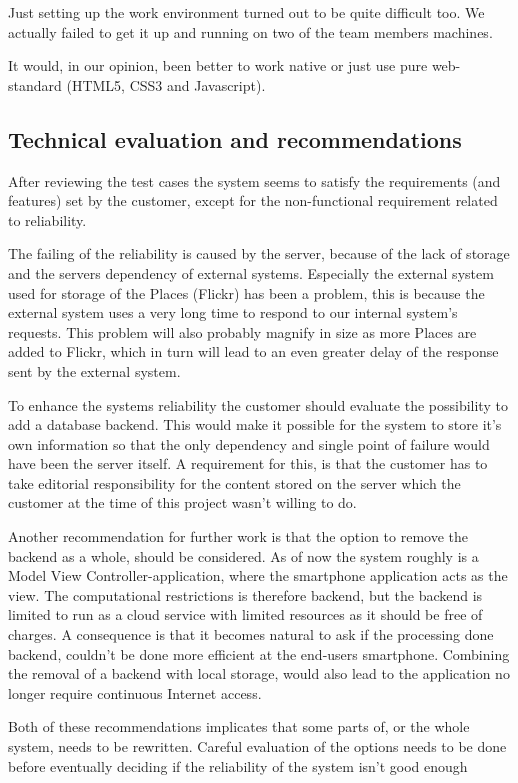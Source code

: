Just setting up the work environment turned out to be quite difficult too. We actually failed to get it up and running on two of the team members machines.

It would, in our opinion, been better to work native or just use pure web-standard (HTML5, CSS3 and Javascript).

	\subsection{Technical evaluation and recommendations}

After reviewing the test cases the system seems to satisfy the requirements (and features) set by the customer, except for the non-functional requirement related to reliability.

The failing of the reliability is caused by the server, because of the lack of storage and the servers dependency of external systems. Especially the external system used for storage of the Places (Flickr) has been a problem, this is because the external system uses a very long time to respond to our internal system's requests. This problem will also probably magnify in size as more Places are added to Flickr, which in turn will lead to an even greater delay of the response sent by the external system.

To enhance the systems reliability the customer should evaluate the possibility to add a database backend. This would make it possible for the system to store it's own information so that the only dependency and single point of failure would have been the server itself. A requirement for this, is that the customer has to take editorial responsibility for the content stored on the server which the customer at the time of this project wasn't willing to do.

Another recommendation for further work is that the option to remove the backend as a whole, should be considered. As of now the system roughly is a Model View Controller-application, where the smartphone application acts as the view. The computational restrictions is therefore backend, but the backend is limited to run as a cloud service with limited resources as it should be free of charges. A consequence is that it becomes natural to ask if the processing done backend, couldn't be done more efficient at the end-users smartphone. Combining the removal of a backend with local storage, would also lead to the application no longer require continuous Internet access.

Both of these recommendations implicates that some parts of, or the whole system, needs to be rewritten. Careful evaluation of the options needs to be done before eventually deciding if the reliability of the system isn't good enough

